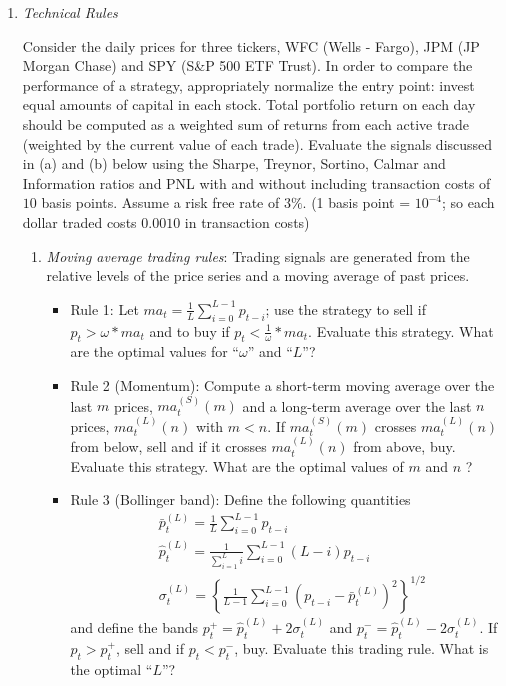 \documentclass[12pt]{article}
\begin{document}
\begin{enumerate}

\item{\it Technical Rules}

Consider the daily prices for three tickers, WFC (Wells - Fargo), JPM (JP Morgan Chase) and SPY (S\&P 500 ETF Trust). In order to compare the performance of a strategy, appropriately normalize the entry point: invest equal amounts of capital in each stock. Total portfolio return on each day should be computed as a weighted sum of returns from each active trade (weighted by the current value of each trade). Evaluate the signals discussed in (a) and (b) below using the Sharpe, Treynor, Sortino, Calmar and Information ratios and PNL with and without including transaction costs of $10$ basis points. Assume a risk free rate of $3\%$. (1 basis point = $10^{-4}$; so each dollar traded costs $0.0010$ in transaction costs)




\begin{enumerate}
\item{\it Moving average trading rules}: Trading signals are generated from the relative levels of the price series and a moving average of past prices.
\begin{itemize}
\item  Rule 1: Let $ma_t = \frac{1}{L}\sum_{i=0}^{L-1}p_{t-i}$; use the strategy to sell if $p_t > \omega*ma_t$ and to buy if $p_t<\frac{1}{\omega}*ma_t$. Evaluate this strategy. What are the optimal values for ``$\omega$'' and ``$L$''?
\item Rule 2 (Momentum): Compute a short-term moving average over the last $m$ prices, $ma^{(S)}_t(m)$ and a long-term average over the last $n$ prices, $ma^{(L)}_t(n)$ with $m<n$. If $ma^{(S)}_t(m)$ crosses $ma^{(L)}_t(n)$ from below, sell and if it crosses $ma^{(L)}_t(n)$ from above, buy. Evaluate this strategy. What are the optimal values of $m$ and $n$ ?
\item Rule 3 (Bollinger band): Define the following quantities
\begin{align*}
&\bar p_t^{(L)} = \frac{1}{L}\sum_{i=0}^{L-1}p_{t-i}\\
&\hat p_t^{(L)} = \frac{1}{\sum_{i=1}^{L}i}\sum_{i=0}^{L-1}(L-i)p_{t-i}\\
&\sigma_t^{(L)} = \left\{\frac{1}{L-1}\sum_{i=0}^{L-1}\left(p_{t-i}-\bar p_t^{(L)}\right)^2\right\}^{1/2}
\end{align*}
and define the bands $p_t^+ = \hat p_t^{(L)} + 2\sigma_t^{(L)}$ and $p_t^- = \hat p_t^{(L)} - 2\sigma_t^{(L)}$. If $p_t>p_t^+$, sell and if $p_t<p_t^-$, buy. Evaluate this trading rule. What is the optimal ``$L$''?



\end{itemize}
\end{enumerate}
\end{enumerate}
\end{document}
